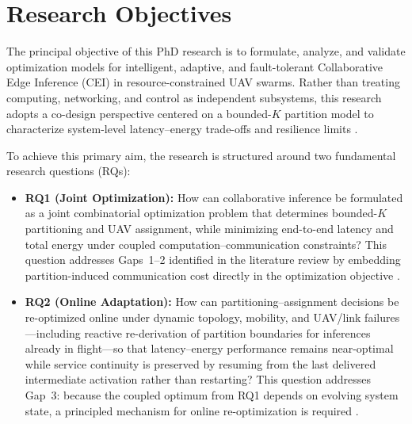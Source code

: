 \section*{Research Objectives}
The principal objective of this PhD research is to formulate, analyze, and validate optimization models for intelligent, adaptive, and fault-tolerant Collaborative Edge Inference (CEI) in resource-constrained UAV swarms. Rather than treating computing, networking, and control as independent subsystems, this research adopts a co-design perspective centered on a bounded-$K$ partition model to characterize system-level latency--energy trade-offs and resilience limits \cite{qu2024elastic,mcenroe2022survey}.

To achieve this primary aim, the research is structured around two fundamental research questions (RQs):
\begin{itemize}
  \item \textbf{RQ1 (Joint Optimization):} How can collaborative inference be formulated as a joint combinatorial optimization problem that determines bounded-$K$ partitioning and UAV assignment, while minimizing end-to-end latency and total energy under coupled computation--communication constraints? This question addresses Gaps~1--2 identified in the literature review by embedding partition-induced communication cost directly in the optimization objective \cite{hu2025splitreview,qu2024elastic,lansky2023firefly,hosseinzadeh2024local,amponis2021fanet,kang2017neurosurgeon,matsubara2022split}.

  \item \textbf{RQ2 (Online Adaptation):} How can partitioning--assignment decisions be re-optimized online under dynamic topology, mobility, and UAV/link failures---including reactive re-derivation of partition boundaries for inferences already in flight---so that latency--energy performance remains near-optimal while service continuity is preserved by resuming from the last delivered intermediate activation rather than restarting? This question addresses Gap~3: because the coupled optimum from RQ1 depends on evolving system state, a principled mechanism for online re-optimization is required \cite{pan2025selfhealing,jamshidi2025resilient,lansky2023firefly,hosseinzadeh2024local,neely2010stochastic,bi2021lyapunov}.
\end{itemize}

